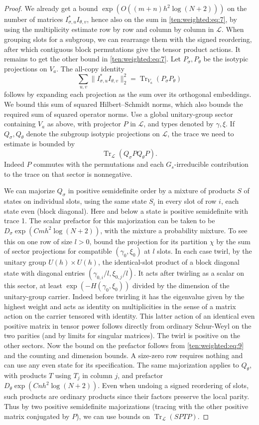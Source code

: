\begin{proof}
We already get a bound \(\exp(O((m+n)h^2\log(N+2)))\) on the number of matrices \(I_{\sigma,u}^*I_{\theta,v}\), hence also on the sum in \eqref{ten:weighted:eq:7}, by using the multiplicity estimate row by row and column by column in \(\mathcal L\). When grouping slots for a subgroup, we can rearrange them with the signed reordering, after which contiguous block permutations give the tensor product actions. It remains to get the other bound in \eqref{ten:weighted:eq:7}. Let $P_\sigma,P_\theta$ be the isotypic projections on $V_a$. The all-copy identity
\[
 \sum_{u,v}\|I_{\sigma,u}^*I_{\theta,v}\|_2^2
 =\operatorname{Tr}_{V_a}(P_\sigma P_\theta)
\]
follows by expanding each projection as the sum over its orthogonal embeddings. We bound this sum of squared Hilbert--Schmidt norms, which also bounds the required sum of squared operator norms. Use a global unitary-group sector containing \(V_a\) as above, with projector \(P\) in \(\mathcal L\), and types denoted by \(\gamma,\xi\). If \(Q_\sigma,Q_\theta\) denote the subgroup isotypic projections on \(\mathcal L\), the trace we need to estimate is bounded by
\[
 \operatorname{Tr}_{\mathcal L}(Q_\sigma P Q_\theta P).
\]
Indeed \(P\) commutes with the permutations and each \(G_s\)-irreducible contribution to the trace on that sector is nonnegative.

We can majorize \(Q_\sigma\) in positive semidefinite order by a mixture of products \(S\) of states on individual slots, using the same state \(S_i\) in every slot of row \(i\), each state even (block diagonal). Here and below a state is positive semidefinite with trace 1. The scalar prefactor for this majorization can be taken to be \(D_\sigma\exp(Cm h^2\log(N+2))\), with the mixture a probability mixture. To see this on one row of size \(l>0\), bound the projection for its partition \(\chi\) by the sum of sector projections for compatible \((\gamma_0,\xi_0)\) at \(l\) slots. In each case twirl, by the unitary group \(U(h)\times U(h)\), the identical-slot product of a block diagonal state with diagonal entries \((\gamma_{0,i}/l,\xi_{0,j}/l)\). It acts after twirling as a scalar on this sector, at least \(\exp(-H(\gamma_0,\xi_0))\) divided by the dimension of the unitary-group carrier. Indeed before twirling it has the eigenvalue given by the highest weight and acts as identity on multiplicities in the sense of a matrix action on the carrier tensored with identity. This latter action of an identical even positive matrix in tensor power follows directly from ordinary Schur-Weyl on the two parities (and by limits for singular matrices). The twirl is positive on the other sectors. Now the bound on the prefactor follows from \eqref{ten:weighted:eq:9} and the counting and dimension bounds. A size-zero row requires nothing and can use any even state for its specification. The same majorization applies to \(Q_\theta\), with products \(T\) using \(T_j\) in column \(j\), and prefactor \(D_\theta\exp(C n h^2\log(N+2))\). Even when undoing a signed reordering of slots, such products are ordinary products since their factors preserve the local parity. Thus by two positive semidefinite majorizations (tracing with the other positive matrix conjugated by \(P\)), we can use bounds on
\(\operatorname{Tr}_{\mathcal L}(S P T P)\).


\end{proof}
